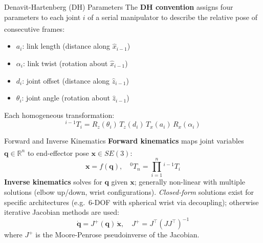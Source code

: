\begin{v3topic}{Denavit-Hartenberg (DH) Parameters}
    The \textbf{DH convention} assigns four parameters to each joint $i$ of a serial manipulator to describe the relative pose of consecutive frames\textsuperscript{\cite[][pp.~45--70]{sicilianoRobotics2009}}:
    \begin{itemize}
        \item $a_i$: link length (distance along $\hat{x}_{i-1}$)
        \item $\alpha_i$: link twist (rotation about $\hat{x}_{i-1}$)
        \item $d_i$: joint offset (distance along $\hat{z}_{i-1}$)
        \item $\theta_i$: joint angle (rotation about $\hat{z}_{i-1}$)
    \end{itemize}
    Each homogeneous transformation:
    \begin{equation}
        {}^{i-1}T_i = R_z(\theta_i)\,T_z(d_i)\,T_x(a_i)\,R_x(\alpha_i)
    \end{equation}

\end{v3topic}
\begin{v3topic}{Forward and Inverse Kinematics}
    \textbf{Forward kinematics} maps joint variables $\mathbf{q} \in \mathbb{R}^n$ to end-effector pose $\mathbf{x} \in SE(3)$\textsuperscript{\cite[][pp.~80--100]{sicilianoRobotics2009}}:
    \begin{equation}
        \mathbf{x} = f(\mathbf{q}), \quad {}^0T_n = \prod_{i=1}^{n} {}^{i-1}T_i
    \end{equation}
    \textbf{Inverse kinematics} solves for $\mathbf{q}$ given $\mathbf{x}$; generally non-linear with multiple solutions (elbow up/down, wrist configurations).
    \emph{Closed-form} solutions exist for specific architectures (e.g.\ 6-DOF with spherical wrist via decoupling); otherwise iterative Jacobian methods are used:
    \begin{equation}
        \dot{\mathbf{q}} = J^+(\mathbf{q})\,\dot{\mathbf{x}}, \quad J^+ = J^\top(J J^\top)^{-1}
    \end{equation}
    where $J^+$ is the Moore-Penrose pseudoinverse of the Jacobian.

\end{v3topic}
